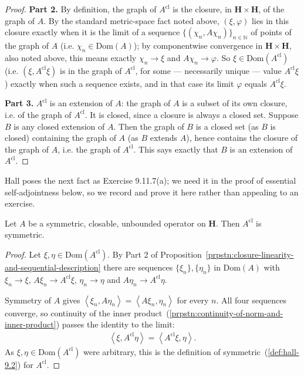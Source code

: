 \begin{proof}
\textbf{Part 2.} By definition, the graph of $A^{\text{cl}}$ is the closure, in $\mathbf{H} \times \mathbf{H}$, of the graph of $A$. By the standard metric-space fact noted above, $(\xi,\varphi)$ lies in this closure exactly when it is the limit of a sequence $\{ (\chi_n, A\chi_n) \}_{n\in\mathbb{N}}$ of points of the graph of $A$ (i.e. $\chi_n \in \text{Dom}(A)$); by componentwise convergence in $\mathbf{H}\times\mathbf{H}$, also noted above, this means exactly $\chi_n \to \xi$ and $A\chi_n \to \varphi$. So $\xi \in \text{Dom}(A^{\text{cl}})$ (i.e. $(\xi, A^{\text{cl}}\xi)$ is in the graph of $A^{\text{cl}}$, for some — necessarily unique — value $A^{\text{cl}}\xi$) exactly when such a sequence exists, and in that case its limit $\varphi$ equals $A^{\text{cl}}\xi$.

\textbf{Part 3.} $A^{\text{cl}}$ is an extension of $A$: the graph of $A$ is a subset of its own closure, i.e. of the graph of $A^{\text{cl}}$. It is closed, since a closure is always a closed set. Suppose $B$ is any closed extension of $A$. Then the graph of $B$ is a closed set (as $B$ is closed) containing the graph of $A$ (as $B$ extends $A$), hence contains the closure of the graph of $A$, i.e. the graph of $A^{\text{cl}}$. This says exactly that $B$ is an extension of $A^{\text{cl}}$.
\end{proof}

Hall poses the next fact as Exercise 9.11.7(a); we need it in the proof of essential self-adjointness below, so we record and prove it here rather than appealing to an exercise.

\begin{lemma}
    \label{lmm:closure-of-symmetric-is-symmetric}
    \leanok
    Let $A$ be a symmetric, closable, unbounded operator on $\mathbf{H}$. Then $A^{\text{cl}}$ is symmetric.
\end{lemma}
\begin{proof}
    \leanok
Let $\xi, \eta \in \text{Dom}(A^{\text{cl}})$. By Part 2 of Proposition~\ref{prpstn:closure-linearity-and-sequential-description} there are sequences $\{\xi_n\}, \{\eta_n\}$ in $\text{Dom}(A)$ with $\xi_n \to \xi$, $A\xi_n \to A^{\text{cl}}\xi$, $\eta_n \to \eta$ and $A\eta_n \to A^{\text{cl}}\eta$.

Symmetry of $A$ gives $\left< \xi_n, A\eta_n \right> = \left< A\xi_n, \eta_n \right>$ for every $n$. All four sequences converge, so continuity of the inner product~(\ref{prpstn:continuity-of-norm-and-inner-product}) passes the identity to the limit:
\begin{align}
    \left< \xi, A^{\text{cl}}\eta \right> = \left< A^{\text{cl}}\xi, \eta \right>.
\end{align}
As $\xi, \eta \in \text{Dom}(A^{\text{cl}})$ were arbitrary, this is the definition of symmetric~(\ref{def:hall-9.2}) for $A^{\text{cl}}$.
\end{proof}

